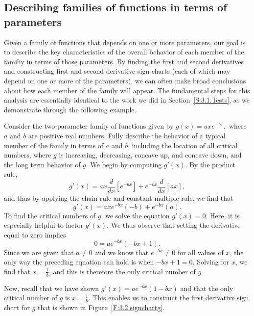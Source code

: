 

\subsection*{Describing families of functions in terms of parameters}

Given a family of functions that depends on one or more parameters, our goal is to describe the key characteristics of the overall behavior of each member of the familiy in terms of those parameters.  By finding the first and second derivatives and constructing first and second derivative sign charts (each of which may depend on one or more of the parameters), we can often make broad conclusions about how each member of the family will appear.  The fundamental steps for this analysis are essentially identical to the work we did in Section~\ref{S:3.1.Tests}, as we demonstrate through the following example.

\bex \label{Ex:3.2.1}
Consider the two-parameter family of functions given by $g(x) = axe^{-bx},$ where $a$ and $b$ are positive real numbers.  Fully describe the behavior of a typical member of the family in terms of $a$ and $b$, including the location of all critical numbers, where $g$ is increasing, decreasing, concave up, and concave down, and the long term behavior of $g$.
\eex
We begin by computing $g'(x)$.  By the product rule,
$$g'(x) = ax \frac{d}{dx}\left[e^{-bx}\right] + e^{-bx} \frac{d}{dx}[ax],$$
and thus by applying the chain rule and constant multiple rule, we find that
$$g'(x) = axe^{-bx}(-b) + e^{-bx}(a).$$
To find the critical numbers of $g$, we solve the equation $g'(x) = 0$.  Here, it is especially helpful to factor $g'(x)$.  We thus observe that setting the derivative equal to zero implies 
$$0 = ae^{-bx}(-bx + 1).$$
Since we are given that $a \ne 0$ and we know that $e^{-bx} \ne 0$ for all values of $x$, the only way the preceding equation can hold is when $-bx + 1 = 0.$ Solving for $x$, we find that $x = \frac{1}{b}$, and this is therefore the only critical number of $g$.

Now, recall that we have shown $g'(x) = ae^{-bx}(1 - bx)$ and that the only critical number of $g$ is $x = \frac{1}{b}$.  This enables us to construct the first derivative sign chart for $g$ that is shown in Figure~\ref{F:3.2.signchartg}.

